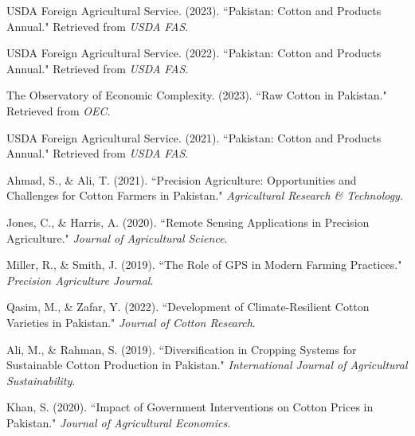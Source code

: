 \documentclass[12pt]{article}
\begin{document}
\newpage
\begin{thebibliography}{10}

  USDA Foreign Agricultural Service. (2023). ``Pakistan: Cotton and Products Annual." Retrieved from \textit{USDA FAS}.

  USDA Foreign Agricultural Service. (2022). ``Pakistan: Cotton and Products Annual." Retrieved from \textit{USDA FAS}.

  The Observatory of Economic Complexity. (2023). ``Raw Cotton in Pakistan." Retrieved from \textit{OEC}.

  USDA Foreign Agricultural Service. (2021). ``Pakistan: Cotton and Products Annual." Retrieved from \textit{USDA FAS}.

  Ahmad, S., \& Ali, T. (2021). ``Precision Agriculture: Opportunities and Challenges for Cotton Farmers in Pakistan." \textit{Agricultural Research \& Technology}.

  Jones, C., \& Harris, A. (2020). ``Remote Sensing Applications in Precision Agriculture." \textit{Journal of Agricultural Science}.

  Miller, R., \& Smith, J. (2019). ``The Role of GPS in Modern Farming Practices." \textit{Precision Agriculture Journal}.

  Qasim, M., \& Zafar, Y. (2022). ``Development of Climate-Resilient Cotton Varieties in Pakistan." \textit{Journal of Cotton Research}.

  Ali, M., \& Rahman, S. (2019). ``Diversification in Cropping Systems for Sustainable Cotton Production in Pakistan." \textit{International Journal of Agricultural Sustainability}.

  Khan, S. (2020). ``Impact of Government Interventions on Cotton Prices in Pakistan." \textit{Journal of Agricultural Economics}.

\end{thebibliography}
  
\end{document}
